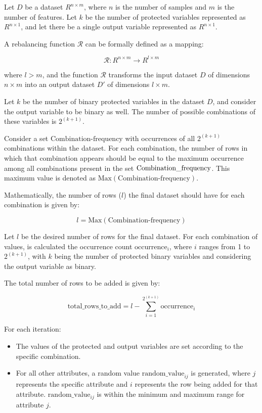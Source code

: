 \documentclass[12pt,a4paper,openright,twoside]{book}
\begin{document}
Let \( D \) be a dataset \( R^{n \times m} \), where \( n \) is the number of samples and \( m \) is the number of features. Let \( k \) be the number of protected variables represented as \( R^{n \times 1} \), and let there be a single output variable represented as \( R^{n \times 1} \).

A rebalancing function \( \mathcal{R} \) can be formally defined as a mapping:

\[
\mathcal{R}: R^{n \times m} \rightarrow R^{l \times m}
\]

where \( l > m \), and the function \( \mathcal{R} \) transforms the input dataset \( D \) of dimensions \( n \times m \) into an output dataset \( D' \) of dimensions \( l \times m \).



Let \( k \) be the number of binary protected variables in the dataset \( D \), and consider the output variable to be binary as well. The number of possible combinations of these variables is \( 2^{(k+1)} \).

Consider a set \( \text{Combination-frequency} \) with occurrences of all \( 2^{(k+1)} \) combinations within the dataset. For each combination, the number of rows in which that combination appears should be equal to the maximum occurrence among all combinations present in the set \( \text{Combination\textunderscore frequency} \). This maximum value is denoted as \( \text{Max}(\text{Combination-frequency}) \).

Mathematically, the number of rows (\( l \)) the final dataset should have for each combination is given by:

\[
l = \text{Max}(\text{Combination-frequency})
\]



Let \( l \) be the desired number of rows for the final dataset. For each combination of values, is calculated the occurrence count \( \text{occurrence}_i \), where \( i \) ranges from 1 to \( 2^{(k+1)} \), with \( k \) being the number of protected binary variables and considering the output variable as binary.

The total number of rows to be added is given by:

\[
\text{total\_rows\_to\_add} = l - \sum_{i=1}^{2^{(k+1)}} \text{occurrence}_i
\]

For each iteration:
\begin{itemize}
    \item The values of the protected and output variables are set according to the specific combination.
    \item For all other attributes, a random value \( \text{random\_value}_{ij} \) is generated, where \( j \) represents the specific attribute and \( i \) represents the row being added for that attribute. \( \text{random\_value}_{ij} \) is within the minimum and maximum range for attribute \( j \).
\end{itemize}
\end{document}
